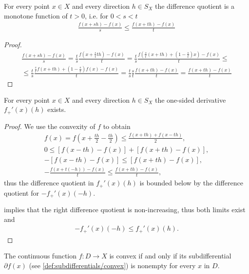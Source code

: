 \begin{lemma}
  \label{thm:convex_difference_quotient_grows}
  For every point $x \in X$ and every direction $h \in S_X$ the difference quotient is a monotone function of $t > 0$, i.e. for $0 < s < t$
  \begin{align*}
    \frac {f(x + sh) - f(x)} s
    \leq
    \frac {f(x + th) - f(x)} t
  \end{align*}
\end{lemma}
\begin{proof}
  \begin{align*}
    \frac {f(x + sh) - f(x)} s
    =
    \frac t s \frac {f(x + \frac s t t h) - f(x)} t
    =
    \frac t s \frac {f\left(\frac s t (x + th) + (1 - \frac s t) x \right) - f(x)} t
    \leq \\ \leq
    \frac t s \frac {\frac s t f(x + t h) + (1 - \frac s t) f(x) - f(x)} t
    =
    \frac t s \frac s t \frac {f(x + th) - f(x)} t
    =
    \frac {f(x + th) - f(x)} t
  \end{align*}
\end{proof}

\begin{proposition}
  \label{thm:convex_one_sided_derivatives_exist}
  For every point $x \in X$ and every direction $h \in S_X$ the one-sided derivative $f_+'(x)(h)$ exists.
\end{proposition}
\begin{proof}
  We use the convexity of $f$ to obtain
  \begin{align*}
    f(x) = f \left(x + \frac {th} 2 - \frac {th} 2 \right) \leq \frac {f(x + th) + f(x - th)} 2,
    \\
    0 \leq [f(x - th) - f(x)] + [f(x + th) - f(x)],
    \\
    -[f(x - th) - f(x)] \leq [f(x + th) - f(x)],
    \\
    -\frac {f(x + t(-h)) - f(x)} t \leq \frac {f(x + th) - f(x)} t,
  \end{align*}
  thus the difference quotient in $f_+'(x)(h)$ is bounded below by the difference quotient for $-f_+'(x)(-h)$.

   implies that the right difference quotient is non-increasing, thus both limits exist and
  \begin{align*}
    -f_+'(x)(-h) \leq f_+'(x)(h).
  \end{align*}
\end{proof}

\begin{proposition}\label{thm:convex_iff_subdifferential_nonempty}
  The continuous function $f: D \to X$ is convex if and only if its subdifferential $\partial f(x)$ (see \cref{def:subdifferentials/convex}) is nonempty for every $x$ in $D$.
\end{proposition}

